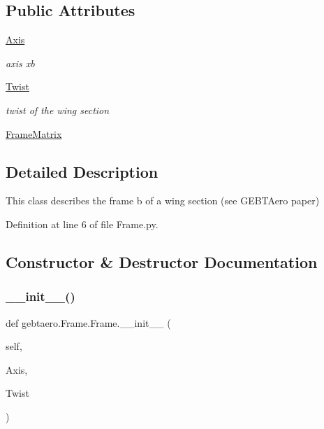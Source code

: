 \subsection*{Public Attributes}
\begin{DoxyCompactItemize}
\item 
\hyperlink{classgebtaero_1_1_frame_1_1_frame_ae08a3f5d573566b87a5a3f206d312a47}{Axis}
\begin{DoxyCompactList}\small\item\em axis xb \end{DoxyCompactList}\item 
\hyperlink{classgebtaero_1_1_frame_1_1_frame_ab64cc356fbc0c271e985c7d6694e31bc}{Twist}
\begin{DoxyCompactList}\small\item\em twist of the wing section \end{DoxyCompactList}\item 
\hyperlink{classgebtaero_1_1_frame_1_1_frame_ac066f787b43713ffdce16e36acfbfdee}{Frame\+Matrix}
\end{DoxyCompactItemize}


\subsection{Detailed Description}
This class describes the frame b of a wing section (see G\+E\+B\+T\+Aero paper) 

Definition at line 6 of file Frame.\+py.



\subsection{Constructor \& Destructor Documentation}
\mbox{\label{classgebtaero_1_1_frame_1_1_frame_a39d919d9d67030dafbe8a4cf44ea53d5}} 
\subsubsection{\texorpdfstring{\+\_\+\+\_\+init\+\_\+\+\_\+()}{\_\_init\_\_()}}
{\footnotesize\ttfamily def gebtaero.\+Frame.\+Frame.\+\_\+\+\_\+init\+\_\+\+\_\+ (\begin{DoxyParamCaption}\item[{}]{self,  }\item[{}]{Axis,  }\item[{}]{Twist }\end{DoxyParamCaption})}



